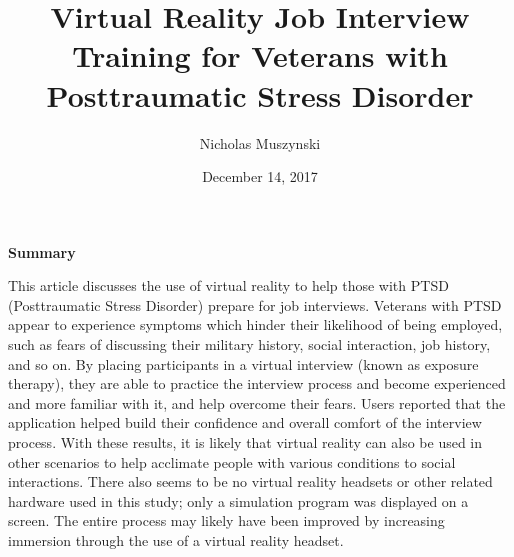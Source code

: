 \documentclass{article}
\begin{document}
\title{Virtual Reality Job Interview Training for Veterans with Posttraumatic Stress Disorder}
\author{Nicholas Muszynski}
\date{December 14, 2017}

\maketitle

\textbf{Summary}
\newline

This article discusses the use of virtual reality to help those with PTSD (Posttraumatic Stress Disorder) prepare for job interviews. Veterans with PTSD appear to experience symptoms which hinder their likelihood of being employed, such as fears of discussing their military history, social interaction, job history, and so on. By placing participants in a virtual interview (known as exposure therapy), they are able to practice the interview process and become experienced and more familiar with it, and help overcome their fears. Users reported that the application helped build their confidence and overall comfort of the interview process. With these results, it is likely that virtual reality can also be used in other scenarios to help acclimate people with various conditions to social interactions. There also seems to be no virtual reality headsets or other related hardware used in this study; only a simulation program was displayed on a screen. The entire process may likely have been improved by increasing immersion through the use of a virtual reality headset.

\nocite{interviewCite}



\end{document}
